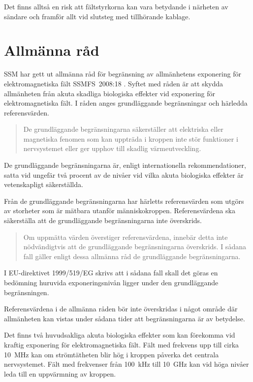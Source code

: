 Det finns alltså en risk att fältstyrkorna kan vara betydande i närheten av
sändare och framför allt vid slutsteg med tillhörande kablage.

\section{Allmänna råd}

SSM har gett ut allmänna råd för begränsning av allmänhetens exponering
för elektromagnetiska fält SSMFS~2008:18 \cite{SSMFS2008:18}.
Syftet med råden är att skydda allmänheten från akuta
skadliga biologiska effekter vid exponering för elektromagnetiska fält.
I råden anges grundläggande begränsningar och härledda referensvärden.

\begin{quote}
	De grundläggande begränsningarna säkerställer att elektriska eller
	magnetiska fenomen som kan uppträda i kroppen inte stör funktioner i
	nervsystemet eller ger upphov till skadlig värmeutveckling.
\end{quote}

De grundläggande begränsningarna är, enligt internationella rekommendationer,
satta vid ungefär två procent av de nivåer vid vilka akuta biologiska effekter
är vetenskapligt säkerställda.

Från de grundläggande begränsningarna har härletts referensvärden som utgörs
av storheter som är mätbara utanför människokroppen.
Referensvärdena ska säkerställa att de grundläggande begränsningarna inte
överskrids.

\begin{quote}
	Om uppmätta värden överstiger referensvärdena, innebär detta inte nödvändigtvis
	att de grundläggande begränsningarna överskrids. I sådana fall gäller enligt
	dessa allmänna råd de grundläggande begränsningarna.
\end{quote}

I EU-direktivet 1999/519/EG \cite{1999/519/EG} skrivs att i sådana fall skall det
göras en bedömning huruvida exponeringsnivån ligger under den grundläggande
begränsningen.

Referensvärdena i de allmänna råden bör inte överskridas i något område där
allmänheten kan vistas under sådana tider att begränsningarna är av betydelse.

Det finns två huvudsakliga akuta biologiska effekter som kan förekomma vid
kraftig exponering för elektromagnetiska fält.
Fält med frekvens upp till cirka \SI{10}{\mega\hertz} kan om strömtätheten blir
hög i kroppen påverka det centrala nervsystemet.
Fält med frekvenser från \SI{100}{\kilo\hertz} till \SI{10}{\giga\hertz} kan vid
höga nivåer leda till en uppvärmning av kroppen.

